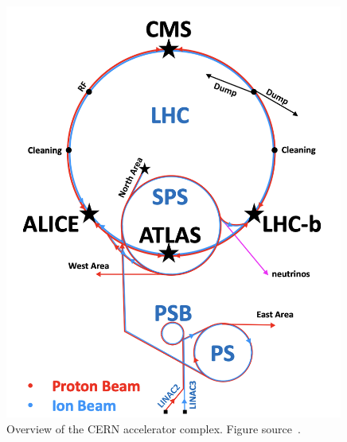 \begin{figure}[t!]
\centering
\includegraphics[width=0.99\textwidth]{figures/acceleration_chain.png}
\caption[CERN accelerator complex]{Overview of the CERN accelerator complex. Figure source~\cite{SMtable}.}
\label{fig:acceleration_complex}
\end{figure}
